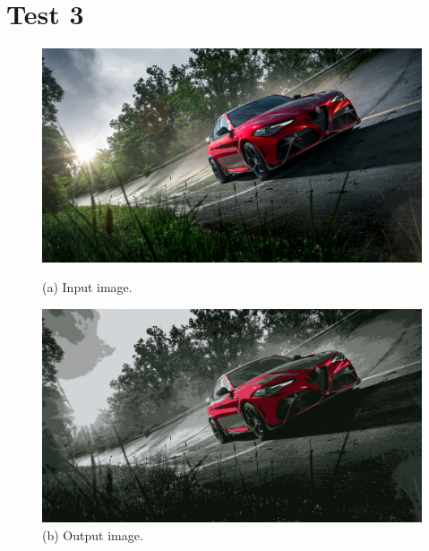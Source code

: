 \section{Test 3}
\begin{figure}[H]
    \centering
    \begin{minipage}[b]{0.45\textwidth}
        \centering
        \includegraphics[width=\textwidth]{images/input_image_t3.jpg}
        \caption{(a) Input image.}
        \label{fig:test_3_input}
    \end{minipage}
    \hfill
    \begin{minipage}[b]{0.45\textwidth}
        \centering
        \includegraphics[width=\textwidth]{images/output_image_t3.jpg}
        \caption{(b) Output image.}
        \label{fig:test_3_output}
    \end{minipage}
    \end{figure}

